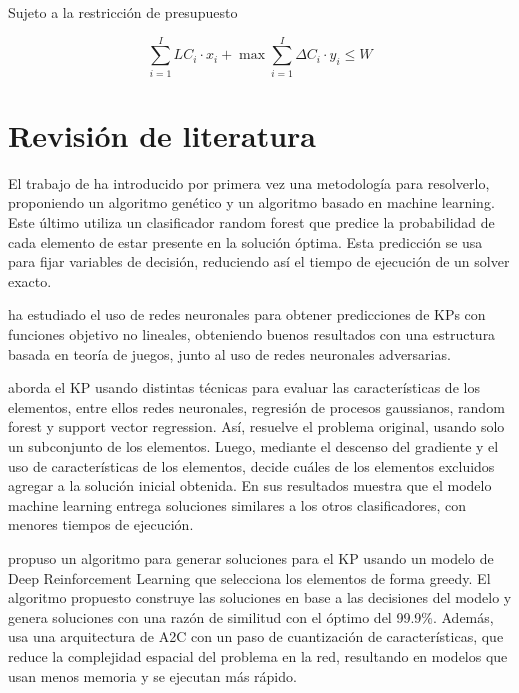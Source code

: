 \documentclass[spanish, a4paper, 12pt, openany,final]{book}
\begin{document}
    
    Sujeto a la restricción de presupuesto
    
    \begin{equation}
    	\sum_{i=1}^I LC_i\cdot x_i  + \max \sum_{i=1}^I \Delta C_i\cdot y_i \leq W        
    \end{equation}
    
\clearpage
\section{Revisión de literatura}


El trabajo de \cite{baldo_polynomial_2023} ha introducido por primera vez una metodología para resolverlo, proponiendo un algoritmo genético y un algoritmo basado en machine learning. Este último utiliza un clasificador random forest que predice la probabilidad de cada elemento de estar presente en la solución óptima. Esta predicción se usa para fijar variables de decisión, reduciendo así el tiempo de ejecución de un solver exacto.

\cite{li_novel_2021} ha estudiado el uso de redes neuronales para obtener predicciones de KPs con funciones objetivo no lineales, obteniendo buenos resultados con una estructura basada en teoría de juegos, junto al uso de redes neuronales adversarias.

\cite{rezoug_application_2022} aborda el KP usando distintas técnicas para evaluar las características de los elementos, entre ellos redes neuronales, regresión de procesos gaussianos, random forest y support vector regression. Así, resuelve el problema original, usando solo un subconjunto de los elementos. Luego, mediante el descenso del gradiente y el uso de características de los elementos, decide cuáles de los elementos excluidos agregar a la solución inicial obtenida. En sus resultados muestra que el modelo machine learning entrega soluciones similares a los otros clasificadores, con menores tiempos de ejecución.

\cite{afshar_state_2020} propuso un algoritmo para generar soluciones para el KP usando un modelo de Deep Reinforcement Learning que selecciona los elementos de forma greedy. El algoritmo propuesto construye las soluciones en base a las decisiones del modelo y genera soluciones con una razón de similitud con el óptimo del 99.9\%. Además, usa una arquitectura de A2C con un paso de cuantización de características, que reduce la complejidad espacial del problema en la red, resultando en modelos que usan menos memoria y se ejecutan más rápido.
\end{document}
